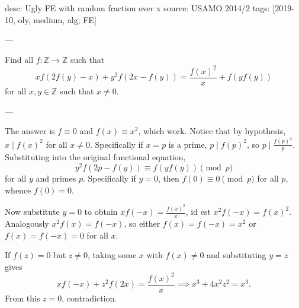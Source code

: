 desc: Ugly FE with random fraction over x
source: USAMO 2014/2
tags: [2019-10, oly, medium, alg, FE]

---

Find all $f:\mathbb Z\to\mathbb Z$ such that \[xf(2f(y)-x)+y^2f(2x-f(y))=\frac{f(x)^2}x+f(yf(y))\]
for all $x,y\in\mathbb Z$ such that $x\ne0$.

---

The answer is $f\equiv0$ and $f(x)\equiv x^2$, which work. Notice that by hypothesis, $x\mid f(x)^2$ for all $x\ne0$. Specifically if $x=p$ is a prime, $p\mid f(p)^2$, so $p\mid\frac{f(p)^2}p$. Substituting into the original functional equation, \[y^2f(2p-f(y))\equiv f(yf(y))\pmod p\]
for all $y$ and primes $p$. Specifically if $y=0$, then $f(0)\equiv0\pmod p$ for all $p$, whence $f(0)=0$.

Now substitute $y=0$ to obtain $xf(-x)=\frac{f(x)^2}x$, id est $x^2f(-x)=f(x)^2$. Analogously $x^2f(x)=f(-x)$, so either $f(x)=f(-x)=x^2$ or $f(x)=f(-x)=0$ for all $x$.

If $f(z)=0$ but $z\ne0$, taking some $x$ with $f(x)\ne0$ and substituting $y=z$ gives \[xf(-x)+z^2f(2x)=\frac{f(x)^2}x\implies x^3+4x^2z^2=x^3.\]
From this $z=0$, contradiction.
